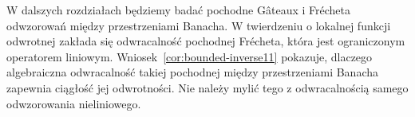 \begin{uwaga}
W dalszych rozdziałach będziemy badać pochodne Gâteaux
i Frécheta odwzorowań między przestrzeniami Banacha.
W twierdzeniu o lokalnej funkcji odwrotnej zakłada się
odwracalność pochodnej Frécheta, która jest ograniczonym
operatorem liniowym. Wniosek~\ref{cor:bounded-inverse11}
pokazuje, dlaczego algebraiczna odwracalność takiej
pochodnej między przestrzeniami Banacha zapewnia
ciągłość jej odwrotności. Nie należy mylić tego z
odwracalnością samego odwzorowania nieliniowego.
\end{uwaga}
